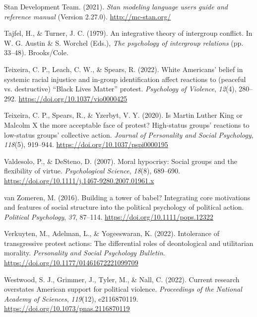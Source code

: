 \documentclass[12pt, letterpaper]{article}
\newenvironment{CSLReferences}[2]{}{}
\begin{document}
\begin{CSLReferences}{1}{0}
\leavevmode{}%
Stan Development Team. (2021). \emph{Stan modeling language users guide
and reference manual} (Version 2.27.0). \url{http://mc-stan.org/}

\leavevmode{}%
Tajfel, H., \& Turner, J. C. (1979). An integrative theory of intergroup
conflict. In W. G. Austin \& S. Worchel (Eds.), \emph{The psychology of
intergroup relations} (pp. 33--48). Brooks/Cole.

\leavevmode{}%
Teixeira, C. P., Leach, C. W., \& Spears, R. (2022). White {Americans}'
belief in systemic racial injustice and in-group identification affect
reactions to ({peaceful} vs. {destructive}) {``{Black Lives Matter}''}
protest. \emph{Psychology of Violence}, \emph{12}(4), 280--292.
\url{https://doi.org/10.1037/vio0000425}

\leavevmode{}%
Teixeira, C. P., Spears, R., \& Yzerbyt, V. Y. (2020). Is {Martin}
{Luther} {King} or {Malcolm} {X} the more acceptable face of protest?
{High}-status groups' reactions to low-status groups' collective action.
\emph{Journal of Personality and Social Psychology}, \emph{118}(5),
919--944. \url{https://doi.org/10.1037/pspi0000195}

\leavevmode{}%
Valdesolo, P., \& DeSteno, D. (2007). Moral hypocrisy: Social groups and
the flexibility of virtue. \emph{Psychological Science}, \emph{18}(8),
689--690. \url{https://doi.org/10.1111/j.1467-9280.2007.01961.x}

\leavevmode{}%
van Zomeren, M. (2016). Building a tower of babel? {Integrating} core
motivations and features of social structure into the political
psychology of political action. \emph{Political Psychology}, \emph{37},
87--114. \url{https://doi.org/10.1111/pops.12322}

\leavevmode{}%
Verkuyten, M., Adelman, L., \& Yogeeswaran, K. (2022). Intolerance of
transgressive protest actions: The differential roles of deontological
and utilitarian morality. \emph{Personality and Social Psychology
Bulletin}. \url{https://doi.org/10.1177/01461672221099709}

\leavevmode{}%
Westwood, S. J., Grimmer, J., Tyler, M., \& Nall, C. (2022). Current
research overstates {American} support for political violence.
\emph{Proceedings of the National Academy of Sciences}, \emph{119}(12),
e2116870119. \url{https://doi.org/10.1073/pnas.2116870119}


\end{CSLReferences}
\end{document}
